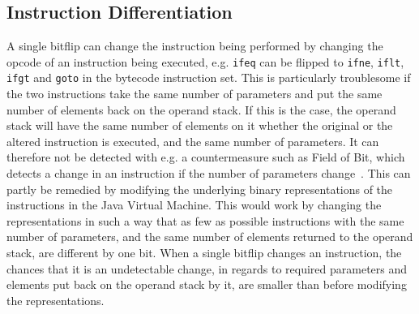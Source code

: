 \subsection{Instruction Differentiation} 
A single bitflip can change the instruction being performed by changing the opcode of an instruction being executed, e.g. \texttt{ifeq} can be flipped to \texttt{ifne}, \texttt{iflt}, \texttt{ifgt} and \texttt{goto} in the \jc bytecode instruction set. This is particularly troublesome if the two instructions take the same number of parameters and put the same number of elements back on the operand stack. If this is the case, the operand stack will have the same number of elements on it whether the original or the altered instruction is executed, and the same number of parameters. It can therefore not be detected with e.g. a countermeasure such as Field of Bit, which detects a change in an instruction if the number of parameters change~\cite[p. 16]{javasec}.
This can partly be remedied by modifying the underlying binary representations of the instructions in the Java Virtual Machine.
This would work by changing the representations in such a way that as few as possible instructions with the same number of parameters, and the same number of elements returned to the operand stack, are different by one bit. 
When a single bitflip changes an instruction, the chances that it is an undetectable change, in regards to required parameters and elements put back on the operand stack by it, are smaller than before modifying the representations.


